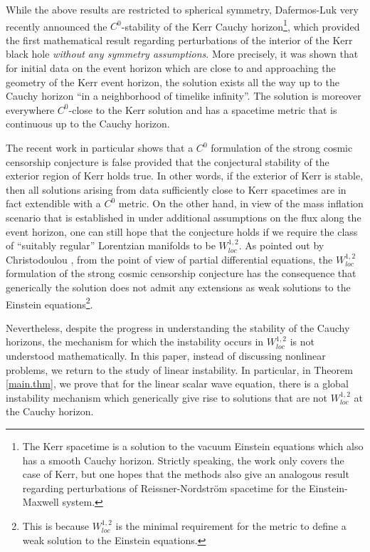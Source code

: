 \documentclass[12 pt, reqno]{amsart}
\theoremstyle{definition}
\theoremstyle{remark}
\numberwithin{equation}{section}
\newcommand{\0}{\emptyset}
\begin{document}
While the above results are restricted to spherical symmetry, Dafermos-Luk \cite{DL} very recently announced the $C^0$-stability of the Kerr Cauchy horizon\footnote{The Kerr spacetime is a solution to the vacuum Einstein equations which also has a smooth Cauchy horizon. Strictly speaking, the work \cite{DL} only covers the case of Kerr, but one hopes that the methods also give an analogous result regarding perturbations of Reissner-Nordstr\"om spacetime for the Einstein-Maxwell system.}, which provided the first mathematical result regarding perturbations of the interior of the Kerr black hole \emph{without any symmetry assumptions}. More precisely, it was shown that for initial data on the event horizon which are close to and approaching the geometry of the Kerr event horizon, the solution exists all the way up to the Cauchy horizon ``in a neighborhood of timelike infinity''. The solution is moreover everywhere $C^0$-close to the Kerr solution and has a spacetime metric that is continuous up to the Cauchy horizon.

The recent work \cite{DL} in particular shows that a $C^0$ formulation of the strong cosmic censorship conjecture is false provided that the conjectural stability of the exterior region of Kerr holds true. In other words, if the exterior of Kerr is stable, then all solutions arising from data sufficiently close to Kerr spacetimes are in fact extendible with a $C^0$ metric. On the other hand, in view of the mass inflation scenario that is established in \cite{D1, D2} under additional assumptions on the flux along the event horizon, one can still hope that the conjecture holds if we require the class of ``suitably regular'' Lorentzian manifolds to be $W^{1,2}_{loc}$. As pointed out by Christodoulou \cite{Chr}, from the point of view of partial differential equations, the $W^{1,2}_{loc}$ formulation of the strong cosmic censorship conjecture has the consequence that generically the solution does not admit any extensions as weak solutions to the Einstein equations\footnote{This is because $W^{1,2}_{loc}$ is the minimal requirement for the metric to define a weak solution to the Einstein equations.}. 

Nevertheless, despite the progress in understanding the stability of the Cauchy horizons, the mechanism for which the instability occurs in $W^{1,2}_{loc}$ is not understood mathematically. In this paper, instead of discussing nonlinear problems, we return to the study of linear instability. In particular, in Theorem \ref{main.thm}, we prove that for the linear scalar wave equation, there is a global instability mechanism which generically give rise to solutions that are not $W^{1,2}_{loc}$ at the Cauchy horizon. 
\end{document}
